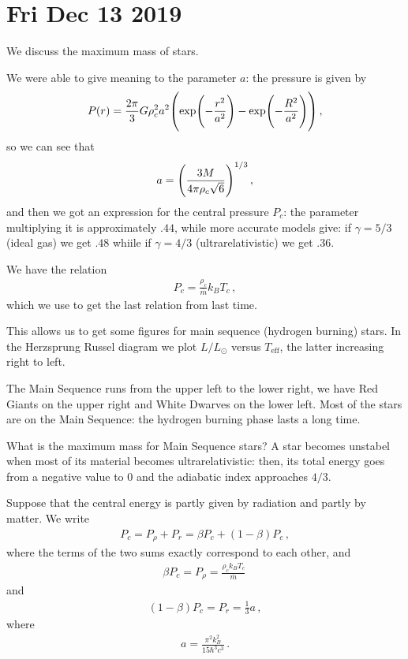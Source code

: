 \documentclass[main.tex]{subfiles}
\begin{document}
\section*{Fri Dec 13 2019}

We discuss the maximum mass of stars. 

We were able to give meaning to the parameter \(a\): the pressure is given by 
%
\begin{align}
  P(r) =
  \frac{2 \pi}{3} G \rho_c^2 a^2 \qty(\exp(- \frac{r^2}{a^2}) - \exp(- \frac{R^2}{a^2}))
\,,
\end{align}
%
so we can see that 
%
\begin{align}
a = \qty(\frac{3M}{4 \pi \rho_c \sqrt{6}})^{1/3}
\,,
\end{align}
%
and then we got an expression for the central pressure \(P_c\): the parameter multiplying it is approximately \(\num{.44}\), while more accurate models give: if \(\gamma = 5/3\) (ideal gas) we get \(\num{.48}\) whiile if \(\gamma = 4/3\) (ultrarelativistic) we get \(\num{.36}\).

We have the relation 
%
\begin{align}
  P_c = \frac{\rho _c }{\overline{m}} k_B T_c
\,,
\end{align}
%
which we use to get the last relation from last time. 

This allows us to get some figures for main sequence (hydrogen burning) stars. 
In the Herzsprung Russel diagram we plot \(L / L_{\odot}\) versus \(T _{\text{eff}}\), the latter increasing right to left. 

The Main Sequence runs from the upper left to the lower right, we have Red Giants on the upper right and White Dwarves on the lower left. 
Most of the stars are on the Main Sequence: the hydrogen burning phase lasts a long time. 

What is the maximum mass for Main Sequence stars? 
A star becomes unstabel when most of its material becomes ultrarelativistic: then, its total energy goes from a negative value to 0 and the adiabatic index approaches \(4/3\). 

Suppose that the central energy is partly given by radiation and partly by matter. 
We write 
%
\begin{align}
  P_c = P_\rho  + P_r = \beta P_c + (1 - \beta )P_c
\,,
\end{align}
%
where the terms of the two sums exactly correspond to each other, and
%
\begin{align}
  \beta P_c = P_\rho = \frac{\rho _c k_B T_c}{\overline{m}}
\,
\end{align}
%
and 
%
\begin{align}
  (1 - \beta ) P_c = P_r = \frac{1}{3} a
\,,
\end{align}
%
where 
%
\begin{align}
  a = \frac{\pi^2   k_B^2}{15 \hbar^3 c^3}
\,.
\end{align}
\end{document}
